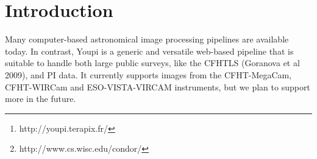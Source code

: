 \documentclass[11pt,twoside]{article}  %
\begin{document}

\setcounter{footnote}{3}


\begin{abstract} 
Youpi\footnote{http://youpi.terapix.fr/} stands for ``YOUpi is your processing PIpeline''. 
It is a modern, easy to use web application providing high level functionalities to perform 
data reduction on scientific FITS images. It is built on top of open source processing tools 
that are released to the community by Terapix, in order to organize your data on a computer 
cluster, to manage your processing jobs in real time (using Condor\footnote{http://www.cs.wisc.edu/condor/}), 
and to facilitate teamwork by allowing fine-grain sharing of results and data.
\end{abstract}


\section{Introduction}

Many computer-based astronomical image processing pipelines are available today. In contrast, 
Youpi is a generic and versatile web-based pipeline that is suitable to handle both large 
public surveys, like the CFHTLS (Goranova et al 2009), and PI data. It currently supports 
images from the CFHT-MegaCam, CFHT-WIRCam and ESO-VISTA-VIRCAM instruments, but we plan to 
support more in the future. 
\end{document}
